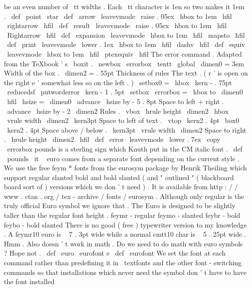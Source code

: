 {{{be
an
even
number
of
%
\
tt
widths
.
Each
\
tt
character
is
1en
so
two
makes
it
1em
.
%
\
def
\
point
{
\
star
}
\
def
\
arrow
{
\
leavevmode
\
raise
.
05ex
\
hbox
to
1em
{
\
hfil
\
rightarrow
\
hfil
}
}
\
def
\
result
{
\
leavevmode
\
raise
.
05ex
\
hbox
to
1em
{
\
hfil
\
Rightarrow
\
hfil
}
}
\
def
\
expansion
{
\
leavevmode
\
hbox
to
1em
{
\
hfil
\
mapsto
\
hfil
}
}
\
def
\
print
{
\
leavevmode
\
lower
.
1ex
\
hbox
to
1em
{
\
hfil
\
dashv
\
hfil
}
}
\
def
\
equiv
{
\
leavevmode
\
hbox
to
1em
{
\
hfil
\
ptexequiv
\
hfil
}
}
%
The
error
{
}
command
.
%
Adapted
from
the
TeXbook
'
s
\
boxit
.
%
\
newbox
\
errorbox
%
{
\
tentt
\
global
\
dimen0
=
3em
}
%
Width
of
the
box
.
\
dimen2
=
.
55pt
%
Thickness
of
rules
%
The
text
.
(
r
'
is
open
on
the
right
e
'
somewhat
less
so
on
the
left
.
)
\
setbox0
=
\
hbox
{
\
kern
-
.
75pt
\
reducedsf
\
putworderror
\
kern
-
1
.
5pt
}
%
\
setbox
\
errorbox
=
\
hbox
to
\
dimen0
{
\
hfil
\
hsize
=
\
dimen0
\
advance
\
hsize
by
-
5
.
8pt
%
Space
to
left
+
right
.
\
advance
\
hsize
by
-
2
\
dimen2
%
Rules
.
\
vbox
{
%
\
hrule
height
\
dimen2
\
hbox
{
\
vrule
width
\
dimen2
\
kern3pt
%
Space
to
left
of
text
.
\
vtop
{
\
kern2
.
4pt
\
box0
\
kern2
.
4pt
}
%
Space
above
/
below
.
\
kern3pt
\
vrule
width
\
dimen2
}
%
Space
to
right
.
\
hrule
height
\
dimen2
}
\
hfil
}
%
\
def
\
error
{
\
leavevmode
\
lower
.
7ex
\
copy
\
errorbox
}
%
pounds
{
}
is
a
sterling
sign
which
Knuth
put
in
the
CM
italic
font
.
%
\
def
\
pounds
{
{
\
it
\
}
}
%
euro
{
}
comes
from
a
separate
font
depending
on
the
current
style
.
%
We
use
the
free
feym
*
fonts
from
the
eurosym
package
by
Henrik
%
Theiling
which
support
regular
slanted
bold
and
bold
slanted
(
and
%
"
outlined
"
(
blackboard
board
sort
of
)
versions
which
we
don
'
t
need
)
.
%
It
is
available
from
http
:
/
/
www
.
ctan
.
org
/
tex
-
archive
/
fonts
/
eurosym
.
%
%
Although
only
regular
is
the
truly
official
Euro
symbol
we
ignore
%
that
.
The
Euro
is
designed
to
be
slightly
taller
than
the
regular
%
font
height
.
%
%
feymr
-
regular
%
feymo
-
slanted
%
feybr
-
bold
%
feybo
-
bold
slanted
%
%
There
is
no
good
(
free
)
typewriter
version
to
my
knowledge
.
%
A
feymr10
euro
is
~
7
.
3pt
wide
while
a
normal
cmtt10
char
is
~
5
.
25pt
wide
.
%
Hmm
.
%
%
Also
doesn
'
t
work
in
math
.
Do
we
need
to
do
math
with
euro
symbols
?
%
Hope
not
.
%
%
\
def
\
euro
{
{
\
eurofont
e
}
}
\
def
\
eurofont
{
%
%
We
set
the
font
at
each
command
rather
than
predefining
it
in
%
\
textfonts
and
the
other
font
-
switching
commands
so
that
%
installations
which
never
need
the
symbol
don
'
t
have
to
have
the
%
font
installed
}}}}
